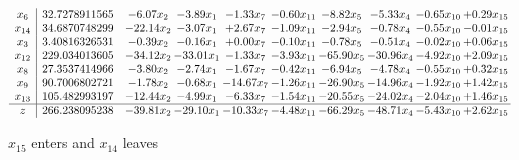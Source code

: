 \documentclass[9pt]{article}
\begin{document}
 \[\begin{array}{c| c c@{\hskip 2pt} c@{\hskip 2pt} c@{\hskip 2pt} c@{\hskip 2pt} c@{\hskip 2pt} c@{\hskip 2pt} c@{\hskip 2pt} c@{\hskip 2pt} }
 x_{6}   &  32.7278911565 & -6.07 x_{2} & -3.89 x_{1} & -1.33 x_{7} & -0.60 x_{11} & -8.82 x_{5} & -5.33 x_{4} & -0.65 x_{10} & +  0.29 x_{15}\\
 x_{14}   &  34.6870748299 & -22.14 x_{2} & -3.07 x_{1} & +  2.67 x_{7} & -1.09 x_{11} & -2.94 x_{5} & -0.78 x_{4} & -0.55 x_{10} & -0.01 x_{15}\\
 x_{3}   &  3.40816326531 & -0.39 x_{2} & -0.16 x_{1} & +  0.00 x_{7} & -0.10 x_{11} & -0.78 x_{5} & -0.51 x_{4} & -0.02 x_{10} & +  0.06 x_{15}\\
 x_{12}   &  229.034013605 & -34.12 x_{2} & -33.01 x_{1} & -1.33 x_{7} & -3.93 x_{11} & -65.90 x_{5} & -30.96 x_{4} & -4.92 x_{10} & +  2.09 x_{15}\\
 x_{8}   &  27.3537414966 & -3.80 x_{2} & -2.74 x_{1} & -1.67 x_{7} & -0.42 x_{11} & -6.94 x_{5} & -4.78 x_{4} & -0.55 x_{10} & +  0.32 x_{15}\\
 x_{9}   &  90.7006802721 & -1.78 x_{2} & -0.68 x_{1} & -14.67 x_{7} & -1.26 x_{11} & -26.90 x_{5} & -14.96 x_{4} & -1.92 x_{10} & +  1.42 x_{15}\\
 x_{13}   &  105.482993197 & -12.44 x_{2} & -4.99 x_{1} & -6.33 x_{7} & -1.54 x_{11} & -20.55 x_{5} & -24.02 x_{4} & -2.04 x_{10} & +  1.46 x_{15}\\
\hline
z    &  266.238095238 & -39.81 x_{2} & -29.10 x_{1} & -10.33 x_{7} & -4.48 x_{11} & -66.29 x_{5} & -48.71 x_{4} & -5.43 x_{10} & +  2.62 x_{15}\\
\end{array}\]


 $ x_{15} $ enters and $ x_{14} $ leaves 
\end{document}
